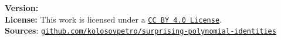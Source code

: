 \noindent
\textbf{Version:}  \\[1em]
\noindent
\textbf{License:} This work is licensed under a
\href{https://creativecommons.org/licenses/by/4.0/}{\texttt{CC BY 4.0 License}}.\\[1em]
\noindent
\textbf{Sources}:
\href{https://github.com/kolosovpetro/unexpected-polynomial-identities-classical-interpolation}
{\texttt{github.com/kolosovpetro/surprising-polynomial-identities}}
